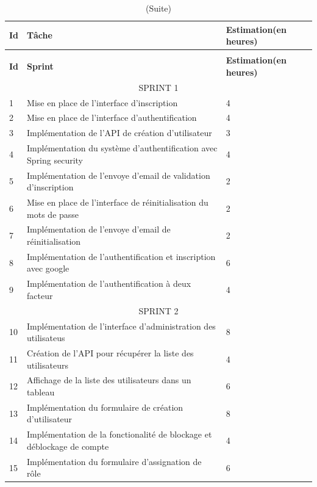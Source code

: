 \documentclass[12pt]{report}
\begin{document}
				\begin{longtable}{|p{1cm}|p{7cm}|p{6cm}|} 
						\caption{Sprint Backlog} 
						\label{tab:SprintBacklog}\\ 
						\hline 
						\textbf{Id} & \textbf{Tâche} & \textbf{Estimation(en heures)} \\ 
						\hline 
						\endfirsthead 	
						\caption[]{(Suite)}\\ 
						\hline 
						\textbf{Id} & \textbf{Sprint} & \textbf{Estimation(en heures)} \\ 
						\hline 
						\endhead			
						\hline
						\multicolumn{3}{|c|}{SPRINT 1}\\
						\hline
						1 & Mise en place de l'interface d'inscription & 4\\
						\hline
						2 & Mise en place de l'interface d'authentification & 4 \\
						\hline
						3 & Implémentation de l'API de création d'utilisateur & 3\\
						\hline
						4 & Implémentation du système d'authentification avec Spring security & 4\\
						\hline
						5 & Implémentation de l'envoye d'email de validation d'inscription& 2\\
						\hline
						6 & Mise en place de l'interface de réinitialisation du mots de passe  & 2\\
						\hline
						7 & Implémentation de l'envoye d'email de réinitialisation & 2\\
						\hline
						8 & Implémentation de l'authentification et inscription avec google & 6\\
						\hline
						9 & Implémentation de l'authentification à deux facteur & 4 \\
						\hline
						\multicolumn{3}{|c|}{SPRINT 2}\\
						\hline
						10 & Implémentation de l'interface d'administration des utilisateus & 8\\
						\hline
						11 & Création de l'API pour récupérer la liste des utilisateurs & 4\\
						\hline
						12 & Affichage de la liste des utilisateurs dans un tableau & 6\\
						\hline
						13 & Implémentation du formulaire de création d'utilisateur & 8\\
						\hline
						14 & Implémentation de la fonctionalité de blockage et déblockage de compte & 4\\
						\hline
						15 & Implémentation du formulaire d'assignation de rôle & 6\\

\end{longtable}
\end{document}
